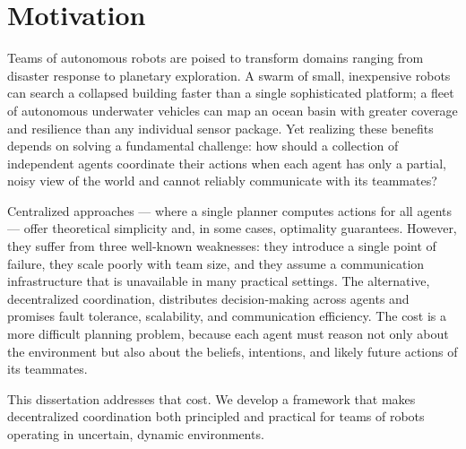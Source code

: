 \section{Motivation}

Teams of autonomous robots are poised to transform domains ranging from disaster
response to planetary exploration. A swarm of small, inexpensive robots can search
a collapsed building faster than a single sophisticated platform; a fleet of autonomous
underwater vehicles can map an ocean basin with greater coverage and resilience
than any individual sensor package. Yet realizing these benefits depends on solving
a fundamental challenge: how should a collection of independent agents coordinate
their actions when each agent has only a partial, noisy view of the world and
cannot reliably communicate with its teammates?

Centralized approaches --- where a single planner computes actions for all agents ---
offer theoretical simplicity and, in some cases, optimality guarantees. However,
they suffer from three well-known weaknesses: they introduce a single point of
failure, they scale poorly with team size, and they assume a communication
infrastructure that is unavailable in many practical settings. The alternative,
decentralized coordination, distributes decision-making across agents and promises
fault tolerance, scalability, and communication efficiency. The cost is a more
difficult planning problem, because each agent must reason not only about the
environment but also about the beliefs, intentions, and likely future actions of
its teammates.

This dissertation addresses that cost. We develop a framework that makes
decentralized coordination both principled and practical for teams of robots
operating in uncertain, dynamic environments.
